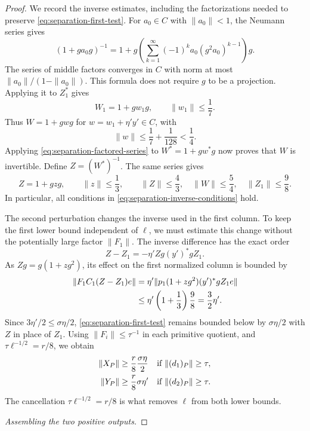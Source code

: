 \begin{proof}
We record the inverse estimates, including the factorizations needed
to preserve \eqref{eq:separation-first-test}.
For $a_0\in C$ with $\|a_0\|<1$, the Neumann series gives
\begin{equation}\label{eq:separation-factored-series}
 (1+ga_0g)^{-1}=1+g\left(
 \sum_{k=1}^{\infty}(-1)^k a_0(g^2a_0)^{k-1}\right)g.
\end{equation}
The series of middle factors converges in $C$ with norm at most
$\|a_0\|/(1-\|a_0\|)$.  This formula does not require $g$ to be
a projection.  Applying it to $Z_1^*$ gives
\[
 W_1=1+gw_1g,\qquad \|w_1\|\le\frac17.
\]
Thus $W=1+gwg$ for $w=w_1+\eta'y'\in C$, with
\[
 \|w\|\le\frac17+\frac1{128}<\frac14.
\]
Applying \eqref{eq:separation-factored-series} to $W^*=1+gw^*g$ now
proves that $W$ is invertible.  Define $Z=(W^*)^{-1}$.  The same
series gives
\begin{equation}\label{eq:separation-inverse-bounds}
 Z=1+gzg,\qquad \|z\|\le\frac13,
 \qquad \|Z\|\le\frac43,
 \quad\|W\|\le\frac54,
 \quad\|Z_1\|\le\frac98.
\end{equation}
In particular, all conditions in
\eqref{eq:separation-inverse-conditions} hold.

The second perturbation changes the inverse used in the first column.
To keep the first lower bound independent of $\ell$, we must estimate
this change without the potentially large factor $\|F_1\|$.
The inverse difference has the exact order
\[
 Z-Z_1=-\eta' Zg(y')^*gZ_1.
\]
As $Zg=g(1+zg^2)$, its effect on the first normalized column is
bounded by
\begin{align}
 \|F_1C_1(Z-Z_1)e\|
 &=\eta'\|p_1(1+zg^2)(y')^*gZ_1e\|\notag\\
 &\le\eta'\left(1+\frac13\right)\frac98
 =\frac32\eta'.
 \label{eq:separation-no-normalization-loss}
\end{align}
Since $3\eta'/2\le\sigma\eta/2$,
\eqref{eq:separation-first-test} remains bounded below by
$\sigma\eta/2$ with $Z$ in place of $Z_1$.
Using $\|F_i\|\le\tau^{-1}$ in each primitive quotient, and
$\tau\ell^{-1/2}=r/8$, we obtain
\begin{align}
 \|X_P\|&\ge\frac r8\frac{\sigma\eta}{2}
 &&\text{if }\|(d_1)_P\|\ge\tau,\notag\\
 \|Y_P\|&\ge\frac r8\sigma\eta'
 &&\text{if }\|(d_2)_P\|\ge\tau.
 \label{eq:separation-high-lower-bounds}
\end{align}
The cancellation $\tau\ell^{-1/2}=r/8$ is what removes
$\ell$ from both lower bounds.

\medskip\noindent\textit{Assembling the two positive outputs.}


\end{proof}
